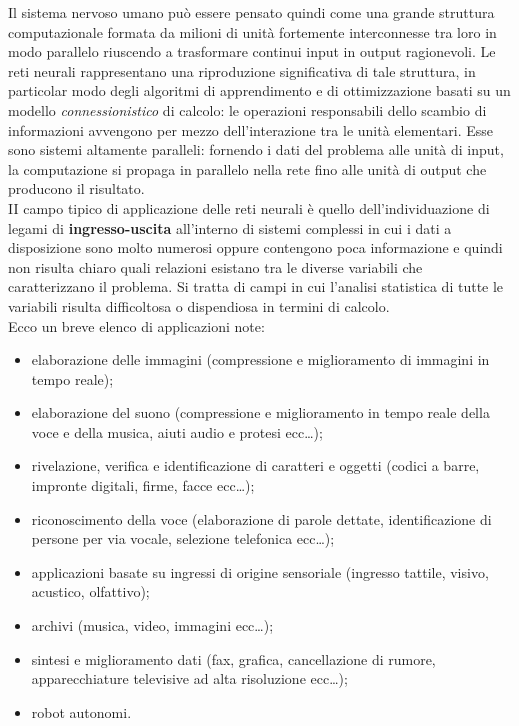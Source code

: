 \documentclass[12pt,a4paper,oneside]{book}
\begin{document}
		\clearpage
		Il sistema nervoso umano può essere pensato quindi come una grande struttura computazionale formata da milioni di unità fortemente interconnesse tra loro in modo parallelo riuscendo a trasformare continui input in output ragionevoli. Le reti neurali rappresentano una riproduzione significativa di tale struttura, in particolar modo degli algoritmi di apprendimento e di ottimizzazione basati su un modello \emph{connessionistico} di calcolo: le operazioni responsabili dello scambio di informazioni avvengono per mezzo dell'interazione tra le unità elementari. Esse sono sistemi altamente paralleli: fornendo i dati del problema alle unità di input, la computazione si propaga in parallelo nella rete fino alle unità di output che producono il risultato.\\
		II campo tipico di applicazione delle reti neurali è quello dell'individuazione di legami di \textbf{ingresso-uscita} all'interno di sistemi complessi in cui i dati a disposizione sono molto 
		numerosi oppure contengono poca informazione e quindi non risulta chiaro quali relazioni esistano tra le diverse variabili che caratterizzano il problema. Si tratta di campi in cui l'analisi statistica di tutte le variabili risulta difficoltosa o dispendiosa in termini di calcolo.\\ 
		Ecco un breve elenco di applicazioni note:
		
		\begin{itemize}
			\item elaborazione delle immagini (compressione e miglioramento di immagini in tempo reale);
			\item elaborazione del suono (compressione e miglioramento in tempo reale della voce e della musica, aiuti audio e protesi ecc\dots);
			\item rivelazione, verifica e identificazione di caratteri e oggetti (codici a barre, impronte digitali, firme, facce ecc\dots );  
			\item riconoscimento della voce (elaborazione di parole dettate, identificazione di persone per via vocale, selezione telefonica ecc\dots );
			\item applicazioni basate su ingressi di origine sensoriale (ingresso tattile, visivo, acustico, olfattivo);
			\item archivi (musica, video, immagini ecc\dots);
			\item sintesi e miglioramento dati (fax, grafica, cancellazione di rumore, apparecchiature televisive ad alta risoluzione ecc\dots);
			\item robot autonomi.
		\end{itemize}
\end{document}
